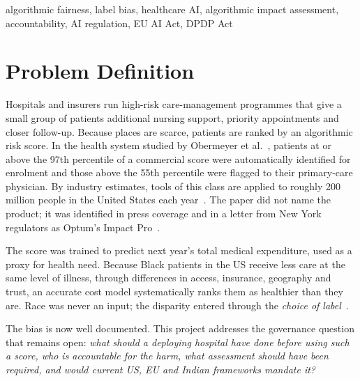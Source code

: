 \documentclass[conference]{IEEEtran}
\begin{document}
\begin{IEEEkeywords}
algorithmic fairness, label bias, healthcare AI, algorithmic impact assessment, accountability, AI regulation, EU AI Act, DPDP Act
\end{IEEEkeywords}

\section{Problem Definition}
Hospitals and insurers run high-risk care-management programmes that give a small group of patients additional nursing support, priority appointments and closer follow-up. Because places are scarce, patients are ranked by an algorithmic risk score. In the health system studied by Obermeyer et al.~\cite{obermeyer2019}, patients at or above the 97th percentile of a commercial score were automatically identified for enrolment and those above the 55th percentile were flagged to their primary-care physician. By industry estimates, tools of this class are applied to roughly 200 million people in the United States each year~\cite{obermeyer2019}. The paper did not name the product; it was identified in press coverage and in a letter from New York regulators as Optum's Impact Pro~\cite{dfs2019,ledford2019}.

The score was trained to predict next year's total medical expenditure, used as a proxy for health need. Because Black patients in the US receive less care at the same level of illness, through differences in access, insurance, geography and trust, an accurate cost model systematically ranks them as healthier than they are. Race was never an input; the disparity entered through the \emph{choice of label}~\cite{obermeyer2019,jacobs2021}.

The bias is now well documented. This project addresses the governance question that remains open: \emph{what should a deploying hospital have done before using such a score, who is accountable for the harm, what assessment should have been required, and would current US, EU and Indian frameworks mandate it?}

\end{document}
